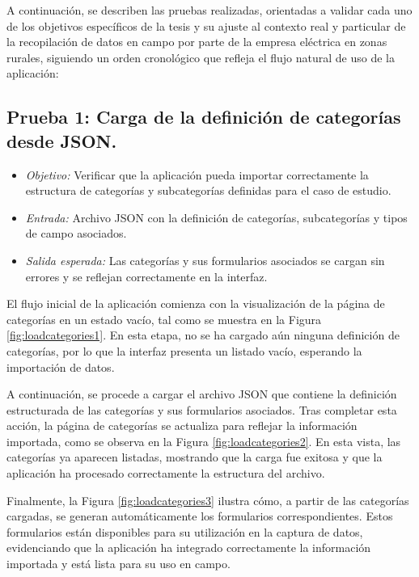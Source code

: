 \documentclass{article}
\begin{document}
A continuación, se describen las pruebas realizadas, orientadas a validar cada uno de los objetivos específicos de la tesis y su ajuste al contexto real y particular de la recopilación de datos en campo por parte de la empresa eléctrica en zonas rurales, siguiendo un orden cronológico que refleja el flujo natural de uso de la aplicación:


\subsection{Prueba 1: Carga de la definición de categorías desde JSON.}
\begin{itemize}
    \item \textit{Objetivo:} Verificar que la aplicación pueda importar correctamente la estructura de categorías y subcategorías definidas para el caso de estudio.
    \item \textit{Entrada:} Archivo JSON con la definición de categorías, subcategorías y tipos de campo asociados.
    \item \textit{Salida esperada:} Las categorías y sus formularios asociados se cargan sin errores y se reflejan correctamente en la interfaz.
\end{itemize}

El flujo inicial de la aplicación comienza con la visualización de la página de categorías en un estado vacío, tal como se muestra en la Figura \ref{fig:loadcategories1}. En esta etapa, no se ha cargado aún ninguna definición de categorías, por lo que la interfaz presenta un listado vacío, esperando la importación de datos.

A continuación, se procede a cargar el archivo JSON que contiene la definición estructurada de las categorías y sus formularios asociados. Tras completar esta acción, la página de categorías se actualiza para reflejar la información importada, como se observa en la Figura \ref{fig:loadcategories2}. En esta vista, las categorías ya aparecen listadas, mostrando que la carga fue exitosa y que la aplicación ha procesado correctamente la estructura del archivo.

Finalmente, la Figura \ref{fig:loadcategories3} ilustra cómo, a partir de las categorías cargadas, se generan automáticamente los formularios correspondientes. Estos formularios están disponibles para su utilización en la captura de datos, evidenciando que la aplicación ha integrado correctamente la información importada y está lista para su uso en campo.
\end{document}
